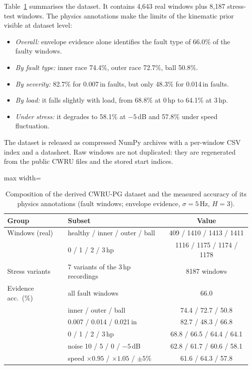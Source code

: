 \documentclass[conference]{IEEEtran}
\begin{document}
Table~\ref{tab:cwrupg} summarises the dataset. It contains 4{,}643 real windows
plus 8{,}187 stress-test windows. The physics annotations make the limits of
the kinematic prior visible at dataset level:
\begin{itemize}
\item \emph{Overall:} envelope evidence alone identifies the fault type of
66.0\% of the faulty windows.
\item \emph{By fault type:} inner race 74.4\%, outer race 72.7\%, ball 50.8\%.
\item \emph{By severity:} 82.7\% for 0.007\,in faults, but only 48.3\% for
0.014\,in faults.
\item \emph{By load:} it falls slightly with load, from 68.8\% at 0\,hp to
64.1\% at 3\,hp.
\item \emph{Under stress:} it degrades to 58.1\% at $-5$\,dB and 57.8\% under
speed fluctuation.
\end{itemize}
The dataset is released as compressed NumPy archives with a per-window CSV
index and a datasheet. Raw windows are not duplicated: they are regenerated
from the public CWRU files and the stored start indices.

\begin{table}[t]
\caption{Composition of the derived CWRU-PG dataset and the measured accuracy
of its physics annotations (fault windows; envelope evidence, $\sigma=5$\,Hz,
$H=3$).}
\label{tab:cwrupg}
\centering
\footnotesize
\begin{adjustbox}{max width=\columnwidth}
\begin{tabular}{llc}
\toprule
Group & Subset & Value \\
\midrule
Windows (real) & healthy / inner / outer / ball & 409 / 1410 / 1413 / 1411 \\
 & 0 / 1 / 2 / 3\,hp & 1116 / 1175 / 1174 / 1178 \\
Stress variants & 7 variants of the 3\,hp recordings & 8187 windows \\
\midrule
Evidence acc.\ (\%) & all fault windows & 66.0 \\
 & inner / outer / ball & 74.4 / 72.7 / 50.8 \\
 & 0.007 / 0.014 / 0.021\,in & 82.7 / 48.3 / 66.8 \\
 & 0 / 1 / 2 / 3\,hp & 68.8 / 66.5 / 64.4 / 64.1 \\
 & noise 10 / 5 / 0 / $-5$\,dB & 62.8 / 61.7 / 60.6 / 58.1 \\
 & speed $\times0.95$ / $\times1.05$ / $\pm5\%$ & 61.6 / 64.3 / 57.8 \\
\bottomrule
\end{tabular}
\end{adjustbox}
\end{table}
\end{document}
